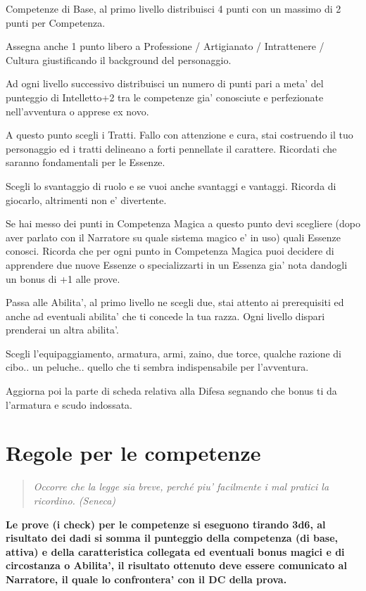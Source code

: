 \documentclass[a4paper,11pt,twoside,openany]{book}
\begin{document}
Competenze di Base, al primo livello distribuisci 4 punti con un massimo di 2 punti per Competenza.

Assegna anche 1 punto libero a Professione / Artigianato / Intrattenere / Cultura giustificando il background del personaggio.

Ad ogni livello successivo distribuisci un numero di punti pari a meta' del punteggio di Intelletto+2 tra le competenze gia' conosciute e perfezionate nell'avventura o apprese ex novo.

A questo punto scegli i Tratti. Fallo con attenzione e cura, stai costruendo il tuo personaggio ed i tratti delineano a forti pennellate il carattere. Ricordati che saranno fondamentali per le Essenze.

Scegli lo svantaggio di ruolo e se vuoi anche svantaggi e vantaggi. Ricorda di giocarlo, altrimenti non e' divertente.

Se hai messo dei punti in Competenza Magica a questo punto devi scegliere (dopo aver parlato con il Narratore su quale sistema magico e' in uso) quali Essenze conosci. Ricorda che per ogni punto in Competenza Magica puoi decidere di apprendere due nuove Essenze o specializzarti in un Essenza gia' nota dandogli un bonus di +1 alle prove.

Passa alle Abilita', al primo livello ne scegli due, stai attento ai prerequisiti ed anche ad eventuali abilita' che ti concede la tua razza. Ogni livello dispari prenderai un altra abilita'.

Scegli l'equipaggiamento, armatura, armi, zaino, due torce, qualche razione di cibo.. un peluche.. quello che ti sembra indispensabile per l'avventura.

Aggiorna poi la parte di scheda relativa alla Difesa segnando che bonus ti da l'armatura e scudo indossata.



\pagebreak

\section{Regole per le competenze}

\label{regole-per-le-competenze}
\begin{quote}\textit{
Occorre che la legge sia breve, perché piu' facilmente i mal pratici la ricordino. (Seneca)
}\end{quote}

\textbf{Le prove (i check) per le competenze si eseguono tirando 3d6, al risultato dei dadi si somma il punteggio della competenza (di base, attiva) e della caratteristica collegata ed eventuali bonus magici e di circostanza o Abilita', il risultato ottenuto deve essere comunicato al Narratore, il quale lo confrontera' con il DC della prova.}
\end{document}
